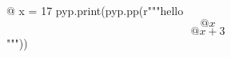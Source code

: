 \documentclass{article}
\begin{document}
@{{{
x = 17
pyp.print(pyp.pp(r"""hello 
$$@x$$
$$@{x+3}$$
"""))
}}}
\end{document}
